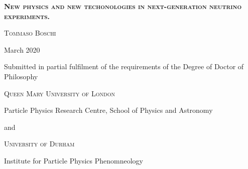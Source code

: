 
\begin{center}
	\bigskip

	\textsc{\Huge \bfseries New physics and new techonologies in next-generation neutrino experiments.}

	\bigskip

	\textsc{\large Tommaso Boschi}

	 March 2020

	\vfill
	Submitted in partial fulfilment of the requirements of the Degree of Doctor of Philosophy


	\vfill
	\textsc{Queen Mary University of London}

	Particle Physics Research Centre, School of Physics and Astronomy

	\bigskip
	and

	\bigskip
	\textsc{University of Durham}

	Institute for Particle Physics Phenomneology

\end{center}

\restoregeometry
